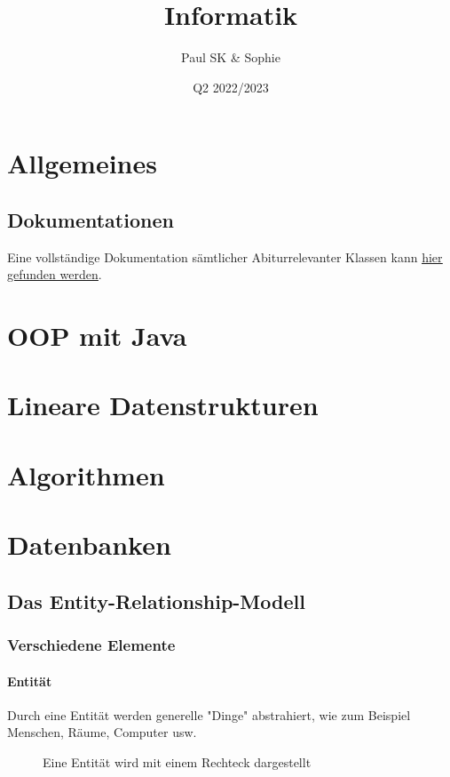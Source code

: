 \documentclass{article}
\title{Informatik}
\date{Q2 2022/2023}
\author{Paul SK \& Sophie}
\begin{document}
	\maketitle
	\newpage


	\section{Allgemeines}
	\subsection{Dokumentationen}
	Eine vollständige Dokumentation sämtlicher Abiturrelevanter Klassen kann \href{https://www.schulentwicklung.nrw.de/lehrplaene/upload/klp\_SII/if/Dokumentation\_ZA-IF\_GK-LK\_ab\_2018\_2021\_12\_22.pdf}{\underline{hier gefunden werden}}.

	\section{OOP mit Java}

	\section{Lineare Datenstrukturen}

	\section{Algorithmen}

	\section{Datenbanken}
	\subsection{Das Entity-Relationship-Modell}
	\subsubsection{Verschiedene Elemente}
	\paragraph{Entität}
	Durch eine Entität werden generelle "Dinge" abstrahiert, wie zum Beispiel Menschen, Räume, Computer usw.

	\begin{figure}[h!]
		\centering
		
		\caption{Eine Entität wird mit einem Rechteck dargestellt}
	\end{figure}	
\end{document}
